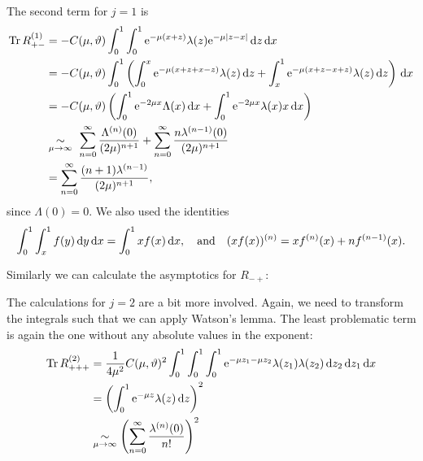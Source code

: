 The second term for $j=1$ is
\begin{align*}
    \Tr R^{(1)}_{+-} &= -C(\mu,\theta)
        \Integ[1]{0}{x}{
            \Integ[1]{0}{z}{\Eto{-\mu(x+z)}
                \lambda(z)\Eto{-\mu\left|z-x\right|}
            }
        } \\
        &= -C(\mu,\theta)
            \Integ[1]{0}{x}{\left(
                \Integ[x]{0}{z}{
                    \Eto{-\mu(x+z+x-z)} \lambda(z)
                }
                +
                \Integ[1]{x}{z}{
                    \Eto{-\mu(x+z-x+z)} \lambda(z)
                }
                \right)
            } \\
        &= -C(\mu,\theta) \left(
            \Integ[1]{0}{x}{\Eto{-2\mu x} \Lambda(x)}
            + \Integ[1]{0}{x}{\Eto{-2\mu x}\lambda(x)x}
            \right) \\
        &\SimAs{\mu\to\infty}\ 
            \sum_{n=0}^\infty \frac{\Lambda^{(n)}(0)}{(2\mu)^{n+1}}
            + \sum_{n=0}^\infty \frac{n\lambda^{(n-1)}(0)}{(2\mu)^{n+1}} \\
        &= \sum_{n=0}^\infty \frac{(n+1)\lambda^{(n-1)}}{(2\mu)^{n+1}},
\end{align*}
since $\Lambda(0) = 0$. We also used the identities
\begin{align*}
    \Integ[1]{0}{x}{\Integ[1]{x}{y}{f(y)}} = \Integ[1]{0}{x}{xf(x)},
    \quad\text{and}\quad
    (xf(x))^{(n)} = xf^{(n)}(x) + nf^{(n-1)}(x).
\end{align*}

Similarly we can calculate the asymptotics for $R_{-+}$:

The calculations for $j = 2$ are a bit more involved. Again, we need to
transform the integrals such that we can apply Watson's lemma. The least
problematic term is again the one without any absolute values in the exponent:
\begin{align*}
    \Tr R^{(2)}_{+++} &= \frac{1}{4\mu^2} C(\mu,\theta)^2
    \Integ[1]{0}{x}{\Integ[1]{0}{z_1}{\Integ[1]{0}{z_2}{\Eto{-\mu z_1 - \mu z_2}
    \lambda(z_1)\lambda(z_2)}}} \\
    &= \left( \Integ[1]{0}{z}{\Eto{-\mu z}\lambda(z)} \right)^2 \\
    &\SimAs{\mu\to\infty} \left( \sum_{n=0}^{\infty}\frac{\lambda^{(n)}(0)}{n!}
    \right)^2
\end{align*}


